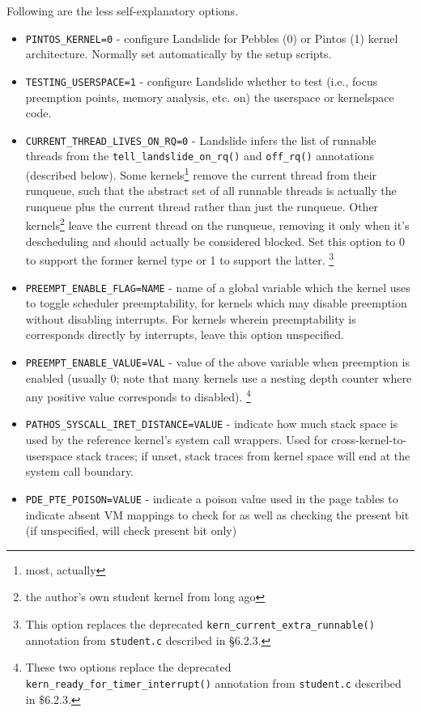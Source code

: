 Following are the less self-explanatory options.
\begin{itemize}
	\item {\tt PINTOS\_KERNEL=0} - configure Landslide for Pebbles (0) or Pintos (1) kernel architecture. Normally set automatically by the setup scripts.
	\item {\tt TESTING\_USERSPACE=1} - configure Landslide whether to test (i.e., focus preemption points, memory analysis, etc. on) the userspace or kernelspace code.
	\item {\tt CURRENT\_THREAD\_LIVES\_ON\_RQ=0} - Landslide infers the list of runnable threads from the {\tt tell\_landslide\_on\_rq()} and {\tt off\_rq()} annotations (described below).
		Some kernels\footnote{most, actually} remove the current thread from their runqueue,
		such that the abstract set of all runnable threads is actually the runqueue plus the current thread rather than just the runqueue.
		Other kernels\footnote{the author's own student kernel from long ago}
		leave the current thread on the runqueue,
		removing it only when it's descheduling and should actually be considered blocked.
		Set this option to 0 to support the former kernel type or 1 to support the latter.%
		\footnote{This option replaces the deprecated {\tt kern\_current\_extra\_runnable()} annotation from {\tt student.c} described in \cite{landslide} \S{}6.2.3.}
	\item {\tt PREEMPT\_ENABLE\_FLAG=NAME} - name of a global variable which the kernel uses to toggle scheduler preemptability, for kernels which may disable preemption without disabling interrupts.
		For kernels wherein preemptability is corresponds directly by interrupts, leave this option unspecified.
	\item {\tt PREEMPT\_ENABLE\_VALUE=VAL} - value of the above variable when preemption is enabled
		(usually 0; note that many kernels use a nesting depth counter where any positive value corresponds to disabled).%
		\footnote{These two options replace the deprecated {\tt kern\_ready\_for\_timer\_interrupt()} annotation from {\tt student.c} described in \cite{landslide} \${}6.2.3.}
	\item {\tt PATHOS\_SYSCALL\_IRET\_DISTANCE=VALUE} - indicate how much stack space is used by the reference kernel's system call wrappers.
		Used for cross-kernel-to-userspace stack traces;
		if unset, stack traces from kernel space will end at the system call boundary.
	\item {\tt PDE\_PTE\_POISON=VALUE} - indicate a poison value used in the page tables to indicate absent VM mappings to check for as well as checking the present bit (if unspecified, will check present bit only)

\end{itemize}
